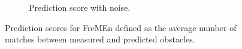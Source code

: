 \begin{figure}[htbp]
\begin{subfigure}[t]{0.49\textwidth}
        \caption{Prediction score with noise.}
        \label{fig:fremen_avg_miss_with_noise}
    \end{subfigure}
    \caption{Prediction scores for FreMEn defined as the average number of matches between measured and predicted obstacles.}
    \label{fig:fremen_avg_correct_predictions}
\end{figure}